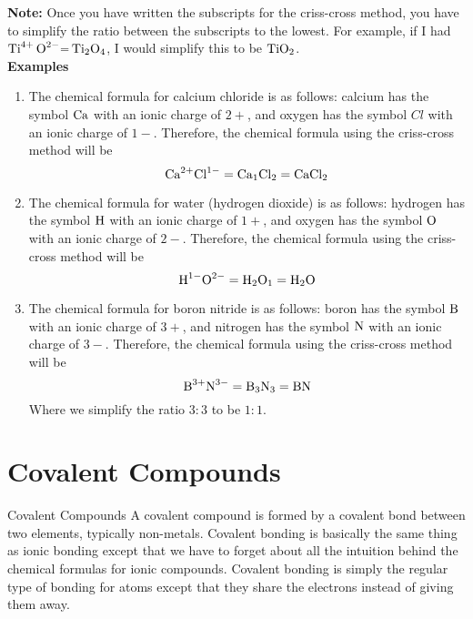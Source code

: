 \documentclass[12pt]{report}
\begin{document}
\textbf{Note:} Once you have written the subscripts for the criss-cross method, you have to simplify the ratio between the subscripts to the lowest. For example, if I had $ \ce{ \text{Ti}^{4+} \text{O}^{2-}= \ce{Ti2O4}}$, I would simplify this to be $ \ce{TiO2}$.\\

\textbf{Examples}
\begin{enumerate}
\setlength\itemsep{0.5em}
\item{The chemical formula for calcium chloride is as follows: calcium has the symbol $\ce{Ca}$ with an ionic charge of $2+$, and oxygen has the symbol $Cl$ with an ionic charge of $1-$. Therefore, the chemical formula using the criss-cross method will be 
           \[
               \text{Ca}^{2+} \text{Cl}^{1-}= \ce{Ca1Cl2}= \ce{CaCl2}
           \]
       }

    \item{The chemical formula for water (hydrogen dioxide) is as follows: hydrogen has the symbol $ \ce{H}$ with an ionic charge of $1+$, and oxygen has the symbol $ \ce{O}$ with an ionic charge of $2-$. Therefore, the chemical formula using the criss-cross method will be  
            \[
                \text{H}^{1-} \text{O}^{2-}= \ce{H2O1}= \ce{H2O}
            \]
        }

        \item{The chemical formula for boron nitride is as follows: boron has the symbol $ \ce{B}$ with an ionic charge of $3+$, and nitrogen has the symbol $ \ce{N}$ with an ionic charge of $3-$. Therefore, the chemical formula using the criss-cross method will be 
                \[
                    \text{B}^{3+} \text{N}^{3-}= \ce{B3N3}= \ce{BN}
                \]
            Where we simplify the ratio $3:3$ to be $1:1$. 
            }
\end{enumerate}

\newpage 
\section{Covalent Compounds}
\begin{definition}{Covalent Compounds}
A covalent compound is formed by a covalent bond between two elements, typically non-metals. Covalent bonding is basically the same thing as ionic bonding except that we have to forget about all the intuition behind the chemical formulas for ionic compounds. Covalent bonding is simply the regular type of bonding for atoms except that they share the electrons instead of giving them away.
\end{definition}
\end{document}
